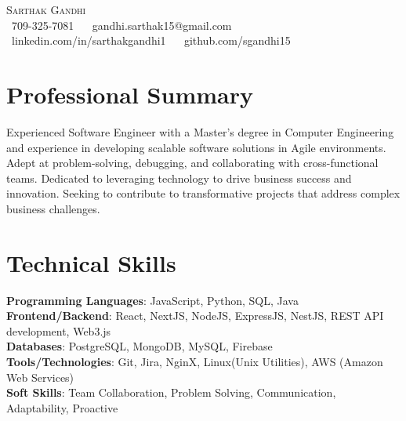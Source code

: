\documentclass[letterpaper,11pt]{article}
\begin{document}
\begin{center}
    {\Huge \scshape Sarthak Gandhi} \\ \vspace{1pt}
    \small \raisebox{-0.1\height}\faPhone\ 709-325-7081 ~ 
    {\raisebox{-0.2\height}\faEnvelope\  {gandhi.sarthak15@gmail.com}} ~ 
    {\raisebox{-0.2\height}\faLinkedin\ {linkedin.com/in/sarthakgandhi1}}  ~
    {\raisebox{-0.2\height}\faGithub\ {github.com/sgandhi15}}
    \vspace{-8pt}
\end{center}


\section{Professional Summary}
Experienced Software Engineer with a Master’s degree in Computer Engineering and experience in developing scalable software solutions in Agile environments. Adept at problem-solving, debugging, and collaborating with cross-functional teams. Dedicated to leveraging technology to drive business success and innovation. Seeking to contribute to transformative projects that address complex business challenges.

\vspace{-8pt}

\section{Technical Skills}
\begin{itemize}[leftmargin=0.15in, label={}]
\small{\item{
\textbf{Programming Languages}{: JavaScript, Python, SQL, Java} \\
\textbf{Frontend/Backend}{: React, NextJS, NodeJS, ExpressJS, NestJS, REST API development, Web3.js} \\
\textbf{Databases}{: PostgreSQL, MongoDB, MySQL, Firebase} \\
\textbf{Tools/Technologies}{: Git, Jira, NginX, Linux(Unix Utilities), AWS (Amazon Web Services)} \\
\textbf{Soft Skills}{: Team Collaboration, Problem Solving, Communication, Adaptability, Proactive} \\
}}
\end{itemize}
\vspace{-16pt}
\end{document}
